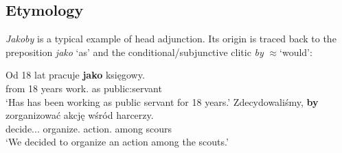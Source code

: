 \documentclass[output=paper
,modfonts
,nonflat]{langsci/langscibook}
\begin{document}
\subsection{Etymology}

\emph{Jakoby} is a typical example of head adjunction. Its origin is traced back to the preposition \emph{jako} `as' and the conditional\slash subjunctive clitic \emph{by} $\approx$`would': 

\ea \ea \gll	Od 18 lat pracuje \textbf{jako} księgowy. \\
		from 18 years work.{\thirdperson}{\sg} as {public:servant} \\
		\glt	`Has has been working as public servant for 18 years.' 
		\ex\gll		Zdecydowaliśmy, \textbf{by} zorganizować akcję wśród harcerzy. \label{pasek} \\
	            decide.{\lptcp}.{\vir}.{\firstperson}{\pl} {\subj} organize.{\infv} action.{\acc} among scours \\
		\glt	 `We decided to organize an action among the scouts.' 
    \z\z		
\end{document}
